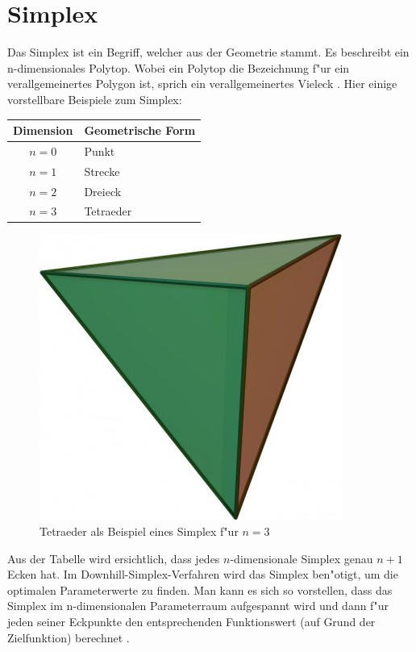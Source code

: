 \section{Simplex}
Das Simplex ist ein Begriff, welcher aus der Geometrie stammt. Es
beschreibt ein n-dimensionales Polytop. Wobei ein Polytop die Bezeichnung
f"ur ein verallgemeinertes Polygon ist, sprich ein verallgemeinertes
Vieleck \cite{bib:link4}. 
Hier einige vorstellbare Beispiele zum Simplex:
 
\begin{tabular}{c|l}
Dimension & Geometrische Form\\
\hline
$n=0$ & Punkt\\
$n=1$ & Strecke\\
$n=2$ & Dreieck\\
$n=3$ & Tetraeder
\end{tabular}

\begin{figure}
\centering
\includegraphics[height=0.25\textwidth]{downhill/tetraeder.jpg}
\caption{Tetraeder als Beispiel eines Simplex f"ur $n=3$}
\end{figure}

Aus der Tabelle wird ersichtlich, dass jedes $n$-dimensionale Simplex genau $n+1$ Ecken hat.
Im Downhill-Simplex-Verfahren wird das Simplex ben"otigt, um die
optimalen Parameterwerte zu finden. Man kann es sich so vorstellen,
dass das Simplex im n-dimensionalen Parameterraum aufgespannt wird und
dann f"ur jeden seiner Eckpunkte den entsprechenden Funktionswert (auf
Grund der Zielfunktion) berechnet \cite{bib:link3}.

